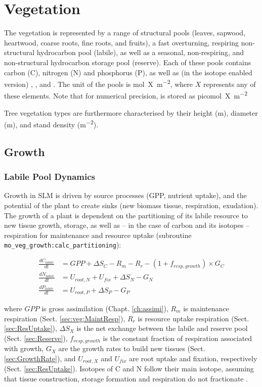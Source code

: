\chapter{Vegetation}\label{ch:veg}

The vegetation is represented by a range of structural pools (leaves, sapwood, heartwood, coarse roots, fine roots, and fruits), a fast overturning, respiring non-structural hydrocarbon pool (labile), as well as a seasonal, non-respiring, and non-structural hydrocarbon storage pool (reserve). Each of these pools contains carbon (C), nitrogen (N) and phosphorus (P), as well as (in the isotope enabled version) , , and . The unit of the pools is \unit{mol X m^{-2}}, where $X$ represents any of these elements. Note that for numerical precision,  is stored as \unit{picomol X m^{-2}} 
 
Tree vegetation types are furthermore characterised by their height (m), diameter (m), and stand density (\unit{m^{-2}}). 

\section{Growth}

\subsection{Labile Pool Dynamics}

Growth in SLM is driven by source processes (GPP, nutrient uptake), and the potential of the plant to create sinks (new biomass tissue, respiration, exudation). The growth of a plant is dependent on the partitioning of its labile resource to new tissue growth, storage, as well as -- in the case of carbon and its isotopes -- respiration for maintenance and resource uptake (subroutine \texttt{mo\_veg\_growth:calc\_partitioning}): 

\begin{subequations}
\begin{align}
\frac{dC_{labile}}{dt} &= GPP + \Delta S_C - R_m - R_r - (1 + f_{resp,growth}) \times G_C \\
\frac{dN_{labile}}{dt} &= U_{root,N} + U_{fix} + \Delta S_N  - G_N  \\
\frac{dP_{labile}}{dt} &= U_{root,P} + \Delta S_P - G_P 
\end{align} 
\end{subequations}
  
where $GPP$ is gross assimilation (Chapt. \ref{ch:assimi}), $R_m$ is maintenance respiration  (Sect. \ref{sec:veg:MaintResp}), $R_r$ is resource uptake respiration (Sect. \ref{sec:ResUptake}), $\Delta S_X$ is the net exchange between the labile and reserve pool (Sect. \ref{sec:Reserve}), $f_{resp,growth}$ is the constant fraction of respiration associated with growth, $G_X$ are the growth rates to build new tissues (Sect. \ref{sec:GrowthRate}), and $U_{root,X}$ and $U_{fix}$ are root uptake and fixation, respectively (Sect. \ref{sec:ResUptake}). Isotopes of C and N follow their main isotope, assuming that tissue construction, storage formation and respiration do not fractionate \cite{Bruggemann:2011co}.  

